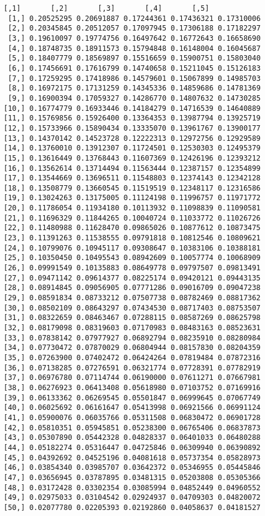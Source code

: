 \documentclass[12pt,english]{article}
\begin{document}
{\begin{multicols}{2}
\begin{Verbatim}[fontsize=\tiny]
            [,1]       [,2]       [,3]       [,4]       [,5]
 [1,] 0.20525295 0.20691887 0.17244361 0.17436321 0.17310006
 [2,] 0.20345845 0.20512057 0.17097945 0.17306188 0.17182297
 [3,] 0.19610097 0.19774756 0.16497642 0.16772643 0.16658690
 [4,] 0.18748735 0.18911573 0.15794848 0.16148004 0.16045687
 [5,] 0.18407779 0.18569897 0.15516659 0.15900751 0.15803040
 [6,] 0.17456691 0.17616799 0.14740658 0.15211045 0.15126183
 [7,] 0.17259295 0.17418986 0.14579601 0.15067899 0.14985703
 [8,] 0.16972175 0.17131259 0.14345336 0.14859686 0.14781369
 [9,] 0.16900394 0.17059327 0.14286770 0.14807632 0.14730285
[10,] 0.16774779 0.16933446 0.14184279 0.14716539 0.14640889
[11,] 0.15769856 0.15926400 0.13364353 0.13987794 0.13925719
[12,] 0.15733966 0.15890434 0.13335070 0.13961767 0.13900177
[13,] 0.14370142 0.14523728 0.12222313 0.12972756 0.12929589
[14,] 0.13760010 0.13912307 0.11724501 0.12530303 0.12495379
[15,] 0.13616449 0.13768443 0.11607369 0.12426196 0.12393212
[16,] 0.13562614 0.13714494 0.11563444 0.12387157 0.12354899
[17,] 0.13544669 0.13696511 0.11548803 0.12374143 0.12342128
[18,] 0.13508779 0.13660545 0.11519519 0.12348117 0.12316586
[19,] 0.13024263 0.13175005 0.11124198 0.11996757 0.11971772
[20,] 0.11786054 0.11934180 0.10113932 0.11098839 0.11090581
[21,] 0.11696329 0.11844265 0.10040724 0.11033772 0.11026726
[22,] 0.11480988 0.11628470 0.09865026 0.10877612 0.10873475
[23,] 0.11391263 0.11538555 0.09791818 0.10812546 0.10809621
[24,] 0.10799076 0.10945117 0.09308647 0.10383106 0.10388181
[25,] 0.10350450 0.10495543 0.08942609 0.10057774 0.10068909
[26,] 0.09991549 0.10135883 0.08649778 0.09797507 0.09813491
[27,] 0.09471142 0.09614377 0.08225174 0.09420121 0.09443135
[28,] 0.08914845 0.09056905 0.07771286 0.09016709 0.09047238
[29,] 0.08591834 0.08733212 0.07507738 0.08782469 0.08817362
[30,] 0.08502109 0.08643297 0.07434530 0.08717403 0.08753507
[31,] 0.08322659 0.08463467 0.07288115 0.08587269 0.08625798
[32,] 0.08179098 0.08319603 0.07170983 0.08483163 0.08523631
[33,] 0.07838142 0.07977927 0.06892794 0.08235910 0.08280984
[34,] 0.07730472 0.07870029 0.06804944 0.08157830 0.08204359
[35,] 0.07263900 0.07402472 0.06424264 0.07819484 0.07872316
[36,] 0.07138285 0.07276591 0.06321774 0.07728391 0.07782919
[37,] 0.06976780 0.07114744 0.06190000 0.07611271 0.07667981
[38,] 0.06276923 0.06413408 0.05618980 0.07103752 0.07169916
[39,] 0.06133362 0.06269545 0.05501847 0.06999645 0.07067749
[40,] 0.06025692 0.06161647 0.05413998 0.06921566 0.06991124
[41,] 0.05900076 0.06035766 0.05311508 0.06830472 0.06901728
[42,] 0.05810351 0.05945851 0.05238300 0.06765406 0.06837873
[43,] 0.05307890 0.05442328 0.04828337 0.06401033 0.06480288
[44,] 0.05182274 0.05316447 0.04725846 0.06309940 0.06390892
[45,] 0.04392692 0.04525196 0.04081618 0.05737354 0.05828973
[46,] 0.03854340 0.03985707 0.03642372 0.05346955 0.05445846
[47,] 0.03656945 0.03787895 0.03481315 0.05203808 0.05305366
[48,] 0.03172428 0.03302354 0.03085994 0.04852449 0.04960552
[49,] 0.02975033 0.03104542 0.02924937 0.04709303 0.04820072
[50,] 0.02077780 0.02205393 0.02192860 0.04058637 0.04181527


\end{Verbatim}
\end{multicols}}
\end{document}
